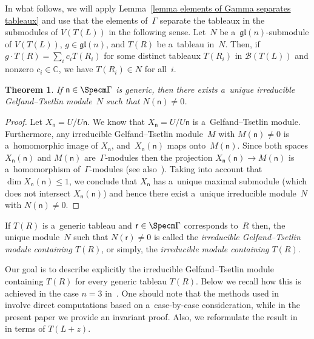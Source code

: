 \documentclass[pdftex]{sigma}
\numberwithin{equation}{section}
\newtheorem{Theorem}{Theorem}[section]
\begin{document}
\begin{Remark}
\label{elements of Gamma separates tableaux}
In what follows, we will apply Lemma~\ref{lemma elements of Gamma separates tableaux} and use that the elements
of~$\Gamma$ separate the tableaux in the submodules of $V(T(L))$ in the following sense.
Let~$N$ be a~$\mathfrak{gl}(n)$-submodule of $V(T(L))$, $g \in \mathfrak{gl}(n)$, and $T(R)$ be a~tableau in~$N$.
Then, if $g \cdot T(R) = \sum\limits_i c_i T(R_i)$ for some distinct tableaux $T(R_i)$ in ${\mathcal B}(T(L))$ and
nonzero $c_i \in {\mathbb C}$, we have $T(R_i) \in N$ for all~$i$.
\end{Remark}

\begin{Theorem}
\label{uniqueness in generic case}
If $\mathsf n\in\Specm\Gamma$ is generic, then there exists a~unique irreducible Gelfand--Tsetlin module~$N$ such that
$N(\mathsf n)\neq 0$.
\end{Theorem}
\begin{proof}
Let $X_{\mathsf n}=U/U \mathsf n$.
We know that $X_{\mathsf n}=U/U \mathsf n$ is a~Gelfand--Tsetlin module.
Furthermore, any irreducible Gelfand--Tsetlin module~$M$ with $M(\mathsf n)\neq 0$ is a~homomorphic image of $X_{\mathsf
n}$, and~$X_{\mathsf n}(\mathsf n)$ maps onto~$M(\mathsf n)$.
Since both spaces $X_{\mathsf n}(\mathsf n)$ and $M(\mathsf n)$ are~$\Gamma$-modules then the projection $X_{\mathsf
n}(\mathsf n) \to M(\mathsf n)$ is a~homomorphism of~$\Gamma$-modules (see also~\cite[Corollary~5.3]{FO2}).
Taking into account that $\dim X_{\mathsf n}(\mathsf n) \leq 1$, we conclude that $X_{\mathsf n}$ has a~unique maximal
submodule (which does not intersect $X_{\mathsf n}(\mathsf n)$) and hence there exist a~unique irreducible module~$N$
with $N(\mathsf n)\neq 0$.
\end{proof}

\begin{Definition}
\label{def-cont}
If $T(R)$ is a~generic tableau and $\mathsf r\in\Specm\Gamma$ corresponds to~$R$ then, the unique module~$N$ such that
$N(\mathsf r) \neq 0$ is called the \emph{irreducible Gelfand--Tsetlin module containing $T(R)$}, or simply, the
\emph{irreducible module containing $T(R)$}.
\end{Definition}

Our goal is to describe explicitly the irreducible Gelfand--Tsetlin module containing $T(R)$ for every generic tableau $T(R)$.
Below we recall how this is achieved in the case $n=3$ in~\cite{Ramirez}.
One should note that the methods used in~\cite{Ramirez} involve direct computations based on a~case-by-case
consideration, while in the present paper we provide an invariant proof.
Also, we reformulate the result in~\cite{Ramirez} in terms of $T(L+z)$.
\end{document}
